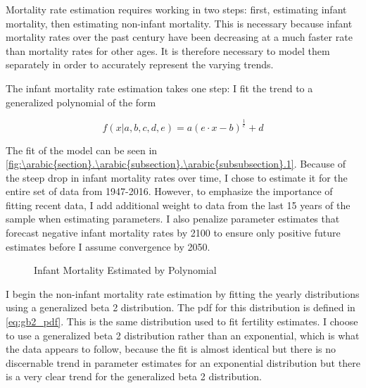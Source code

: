 \documentclass[10pt]{article}
\renewcommand{\thesection}{\arabic{section}}
\renewcommand{\thesubsection}{\thesection.\arabic{subsection}}
\renewcommand{\thesubsubsection}{\thesubsection.\arabic{subsubsection}}
\numberwithin{equation}{subsection}
\newcommand*{\FigureDir}{../../graphs}
\begin{document}
\par Mortality rate estimation requires working in two steps: first, estimating infant mortality, then estimating non-infant mortality. This is necessary because infant mortality rates over the past century have been decreasing at a much faster rate than mortality rates for other ages. It is therefore necessary to model them separately in order to accurately represent the varying trends.

\par The infant mortality rate estimation takes one step: I fit the trend to a generalized polynomial of the form

\begin{equation}
   f(x|a, b, c, d, e) = a (e \cdot x - b)^{\frac{1}{c}} + d
\end{equation}

\par The fit of the model can be seen in \autoref{fig:\thesubsubsection.1}. Because of the steep drop in infant mortality rates over time, I chose to estimate it for the entire set of data from 1947-2016. However, to emphasize the importance of fitting recent data, I add additional weight to data from the last 15 years of the sample when estimating parameters. I also penalize parameter estimates that forecast negative infant mortality rates by 2100 to ensure only positive future estimates before I assume convergence by 2050.

\begin{figure}[!ht]
   \centering
   \caption{\label{fig:\thesubsubsection.1}Infant Mortality Estimated by Polynomial}
\end{figure}

\par I begin the non-infant mortality rate estimation by fitting the yearly distributions using a generalized beta 2 distribution. The pdf for this distribution is defined in \ref{eq:gb2_pdf}. This is the same distribution used to fit fertility estimates. I choose to use a generalized beta 2 distribution rather than an exponential, which is what the data appears to follow, because the fit is almost identical but there is no discernable trend in parameter estimates for an exponential distribution but there is a very clear trend for the generalized beta 2 distribution.
\end{document}
